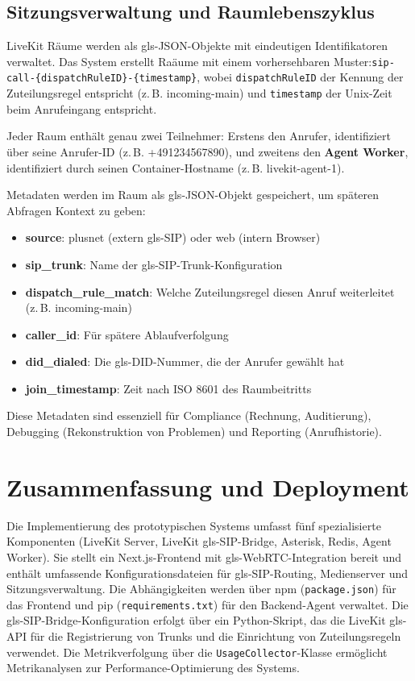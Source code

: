 \subsection{Sitzungsverwaltung und Raumlebenszyklus}

LiveKit Räume werden als \gls{gls-JSON}-Objekte mit eindeutigen Identifikatoren verwaltet. Das System erstellt Raäume mit einem vorhersehbaren Muster:\newline \texttt{sip-call-\{dispatchRuleID\}-\{timestamp\}}, wobei \texttt{dispatchRuleID} der Kennung der Zuteilungsregel entspricht (z.\,B. incoming-main) und
\texttt{timestamp} der Unix-Zeit beim Anrufeingang entspricht.

Jeder Raum enthält genau zwei Teilnehmer: Erstens den Anrufer, identifiziert über seine Anrufer-ID (z.\,B. +491234567890), und zweitens den \textbf{Agent Worker}, identifiziert durch seinen Container-Hostname (z.\,B. livekit-agent-1).

Metadaten werden im Raum als \gls{gls-JSON}-Objekt gespeichert, um späteren Abfragen Kontext zu geben:
\begin{itemize}
  \item \textbf{source}: plusnet (extern \gls{gls-SIP}) oder web (intern Browser)
  \item \textbf{sip\_trunk}: Name der \gls{gls-SIP}-Trunk-Konfiguration
  \item \textbf{dispatch\_rule\_match}: Welche Zuteilungsregel diesen Anruf weiterleitet (z.\,B. incoming-main)
  \item \textbf{caller\_id}: Für spätere Ablaufverfolgung
  \item \textbf{did\_dialed}: Die \gls{gls-DID}-Nummer, die der Anrufer gewählt hat
  \item \textbf{join\_timestamp}: Zeit nach ISO 8601 des Raumbeitritts
\end{itemize}

Diese Metadaten sind essenziell für Compliance (Rechnung, Auditierung), Debugging (Rekonstruktion von Problemen) und
Reporting (Anrufhistorie).

\section{Zusammenfassung und Deployment}

Die Implementierung des prototypischen Systems umfasst fünf spezialisierte Komponenten (LiveKit Server, LiveKit \gls{gls-SIP}-Bridge, Asterisk, Redis, Agent Worker). Sie stellt ein Next.js-Frontend mit \gls{gls-WebRTC}-Integration bereit und enthält umfassende Konfigurationsdateien für \gls{gls-SIP}-Routing, Medienserver und Sitzungsverwaltung. Die Abhängigkeiten werden über npm (\texttt{package.json}) für das Frontend und pip (\texttt{requirements.txt}) für den Backend-Agent verwaltet. Die \gls{gls-SIP}-Bridge-Konfiguration erfolgt über ein Python-Skript, das die LiveKit \gls{gls-API} für die Registrierung von Trunks und die Einrichtung von Zuteilungsregeln verwendet. Die Metrikverfolgung über die \texttt{UsageCollector}-Klasse ermöglicht Metrikanalysen zur Performance-Optimierung des Systems.

